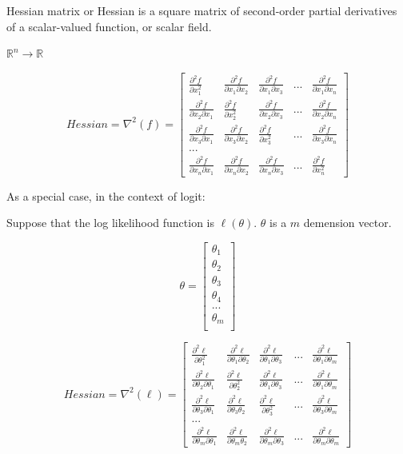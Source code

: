 \documentclass[]{book}
\begin{document}
Hessian matrix or Hessian is a square matrix of second-order partial derivatives of a scalar-valued function, or scalar field.

\(\mathbb{R}^n \rightarrow \mathbb{R}\)

\[Hessian=\nabla ^2(f) =\begin{bmatrix}
\frac{\partial^2 f}{\partial x_1^2} & \frac{\partial^2 f}{\partial x_1 \partial x_2} & \frac{\partial^2 f}{\partial x_1 \partial x_3} & ... & \frac{\partial^2 f}{\partial x_1 \partial x_n}\\
\frac{\partial^2 f}{\partial x_2 \partial x_1} & \frac{\partial^2 f}{\partial x_2^2} & \frac{\partial^2 f}{\partial x_2 \partial x_3} & ... & \frac{\partial^2 f}{\partial x_2 \partial x_n} \\
\frac{\partial^2 f}{\partial x_3 \partial x_1} & \frac{\partial^2 f}{\partial x_3 \partial x_2} & \frac{\partial^2 f}{\partial x_3^2} & ... & \frac{\partial^2 f}{\partial x_3 \partial x_n} \\
...\\
\frac{\partial^2 f}{\partial x_n \partial x_1} & \frac{\partial^2 f}{\partial x_n \partial x_2} & \frac{\partial^2 f}{\partial x_n \partial x_3} & ... & \frac{\partial^2 f}{\partial x_n^2}
\end{bmatrix}\]

As a special case, in the context of logit:

Suppose that the log likelihood function is \(\ell (\theta)\). \(\theta\) is a \(m\) demension vector.

\[ \theta = \begin{bmatrix}\theta_1 \\
\theta_2 \\
\theta_3 \\
\theta_4 \\
...\\
\theta_m \\
\end{bmatrix}\]

\[Hessian=\nabla ^2(\ell) =\begin{bmatrix}
\frac{\partial^2 \ell}{\partial \theta_1^2} & \frac{\partial^2 \ell}{\partial \theta_1 \partial \theta_2} & \frac{\partial^2 \ell}{\partial \theta_1 \partial \theta_3} & ... & \frac{\partial^2 \ell}{\partial \theta_1 \partial \theta_m}\\
\frac{\partial^2 \ell}{\partial \theta_2 \partial \theta_1} & \frac{\partial^2 \ell}{\partial \theta_2^2 } & \frac{\partial^2 \ell}{\partial \theta_1 \partial \theta_3} & ... & \frac{\partial^2 \ell}{\partial \theta_1 \partial \theta_m} \\
\frac{\partial^2 \ell}{\partial \theta_3 \partial \theta_1} & \frac{\partial^2 \ell}{\partial \theta_3 \theta_2 } & \frac{\partial^2 \ell}{\partial \theta_3^2} & ... & \frac{\partial^2 \ell}{\partial \theta_3 \partial \theta_m} \\
...\\
\frac{\partial^2 \ell}{\partial \theta_m \partial \theta_1} & \frac{\partial^2 \ell}{\partial \theta_m \theta_2 } & \frac{\partial^2 \ell}{\partial \theta_m \partial \theta_3} & ... & \frac{\partial^2 \ell}{\partial \theta_m \partial \theta_m} 
\end{bmatrix}\]
\end{document}
